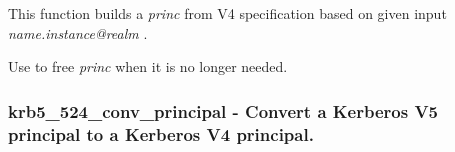 \documentclass[letterpaper,10pt,english]{sphinxmanual}
\begin{document}
This function builds a \emph{princ} from V4 specification based on given input \emph{name.instance@realm} .

Use {\hyperref[appdev/refs/api/krb5_free_principal:c.krb5_free_principal]{}} to free \emph{princ} when it is no longer needed.


\subsubsection{krb5\_524\_conv\_principal -  Convert a Kerberos V5 principal to a Kerberos V4 principal.}
\label{appdev/refs/api/krb5_524_conv_principal:krb5-524-conv-principal-convert-a-kerberos-v5-principal-to-a-kerberos-v4-principal}\label{appdev/refs/api/krb5_524_conv_principal::doc}

\begin{fulllineitems}
\label{appdev/refs/api/krb5_524_conv_principal:c.krb5_524_conv_principal}
\end{fulllineitems}
\end{document}
